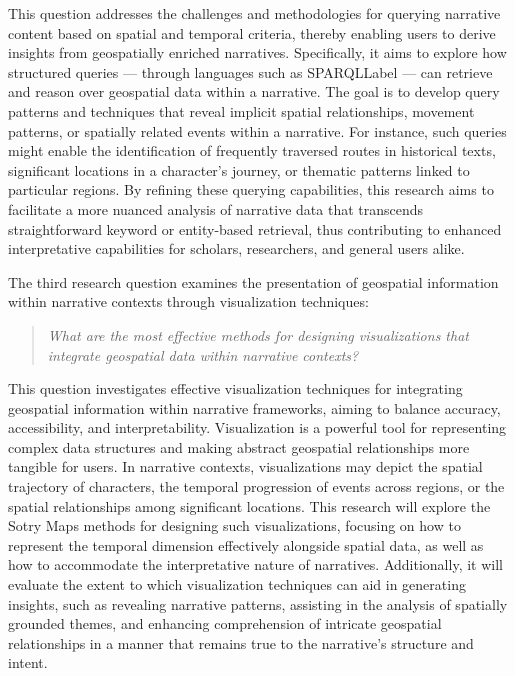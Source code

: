 This question addresses the challenges and methodologies for querying narrative content based on spatial and temporal criteria, thereby enabling users to derive insights from geospatially enriched narratives. Specifically, it aims to explore how structured queries — through languages such as \acrshort{SPARQLLabel} — can retrieve and reason over geospatial data within a narrative. The goal is to develop query patterns and techniques that reveal implicit spatial relationships, movement patterns, or spatially related events within a narrative. For instance, such queries might enable the identification of frequently traversed routes in historical texts, significant locations in a character’s journey, or thematic patterns linked to particular regions. By refining these querying capabilities, this research aims to facilitate a more nuanced analysis of narrative data that transcends straightforward keyword or entity-based retrieval, thus contributing to enhanced interpretative capabilities for scholars, researchers, and general users alike.

The third research question examines the presentation of geospatial information within narrative contexts through visualization techniques:

\begin{quote}
\emph{What are the most effective methods for designing visualizations that integrate geospatial data within narrative contexts?}
\end{quote}

This question investigates effective visualization techniques for integrating geospatial information within narrative frameworks, aiming to balance accuracy, accessibility, and interpretability. Visualization is a powerful tool for representing complex data structures and making abstract geospatial relationships more tangible for users. In narrative contexts, visualizations may depict the spatial trajectory of characters, the temporal progression of events across regions, or the spatial relationships among significant locations. This research will explore the Sotry Maps methods for designing such visualizations, focusing on how to represent the temporal dimension effectively alongside spatial data, as well as how to accommodate the interpretative nature of narratives. Additionally, it will evaluate the extent to which visualization techniques can aid in generating insights, such as revealing narrative patterns, assisting in the analysis of spatially grounded themes, and enhancing comprehension of intricate geospatial relationships in a manner that remains true to the narrative’s structure and intent.

